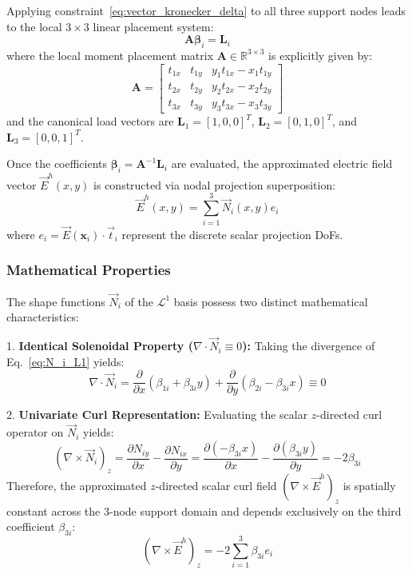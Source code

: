 \documentclass[preprint,12pt]{elsarticle}
\begin{document}
Applying constraint~\eqref{eq:vector_kronecker_delta} to all three support nodes leads to the local $3 \times 3$ linear placement system:
\begin{equation}
    \mathbf{A} \boldsymbol{\beta}_i = \mathbf{L}_i
    \label{eq:linear_placement_system}
\end{equation}
where the local moment placement matrix $\mathbf{A} \in \mathbb{R}^{3 \times 3}$ is explicitly given by:
\begin{equation}
    \mathbf{A} = \begin{bmatrix}
        t_{1x} & t_{1y} & y_1 t_{1x} - x_1 t_{1y} \\
        t_{2x} & t_{2y} & y_2 t_{2x} - x_2 t_{2y} \\
        t_{3x} & t_{3y} & y_3 t_{3x} - x_3 t_{3y}
    \end{bmatrix}
    \label{eq:matrix_A_L1}
\end{equation}
and the canonical load vectors are $\mathbf{L}_1 = [1, 0, 0]^T$, $\mathbf{L}_2 = [0,1,0]^T$, and $\mathbf{L}_3 = [0,0,1]^T$.

Once the coefficients $\boldsymbol{\beta}_i = \mathbf{A}^{-1} \mathbf{L}_i$ are evaluated, the approximated electric field vector $\vec{E}^h(x, y)$ is constructed via nodal projection superposition:
\begin{equation}
    \vec{E}^h(x, y) = \sum_{i=1}^3 \vec{N}_i(x, y) e_i
\end{equation}
where $e_i = \vec{E}(\mathbf{x}_i) \cdot \vec{t}_i$ represent the discrete scalar projection DoFs.

\subsubsection{Mathematical Properties}
The shape functions $\vec{N}_i$ of the $\mathcal{L}^1$ basis possess two distinct mathematical characteristics:

1. \textbf{Identical Solenoidal Property ($\nabla \cdot \vec{N}_i \equiv 0$):} Taking the divergence of Eq.~\eqref{eq:N_i_L1} yields:
\begin{equation}
    \nabla \cdot \vec{N}_i = \frac{\partial}{\partial x}(\beta_{1i} + \beta_{3i} y) + \frac{\partial}{\partial y}(\beta_{2i} - \beta_{3i} x) \equiv 0
\end{equation}

2. \textbf{Univariate Curl Representation:} Evaluating the scalar $z$-directed curl operator on $\vec{N}_i$ yields:
\begin{equation}
    (\nabla \times \vec{N}_i)_z = \frac{\partial N_{iy}}{\partial x} - \frac{\partial N_{ix}}{\partial y} = \frac{\partial (-\beta_{3i} x)}{\partial x} - \frac{\partial (\beta_{3i} y)}{\partial y} = -2\beta_{3i}
\end{equation}
Therefore, the approximated $z$-directed scalar curl field $(\nabla \times \vec{E}^h)_z$ is spatially constant across the 3-node support domain and depends exclusively on the third coefficient $\beta_{3i}$:
\begin{equation}
    (\nabla \times \vec{E}^h)_z = -2 \sum_{i=1}^3 \beta_{3i} e_i
\end{equation}
\end{document}
